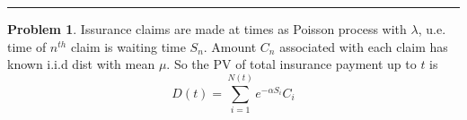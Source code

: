 \documentclass[a4paper, 10pt]{article}
\theoremstyle{definition}
\newtheorem{problem}{Problem}
\theoremstyle{hSol}
\begin{document}
\noindent\rule{16cm}{0.4pt}
\begin{problem} Issurance claims are made at times as Poisson process with $\lambda$, u.e. time of $n^{th}$ claim is waiting time $S_n$. Amount $C_n$ associated with each claim has known i.i.d dist with mean $\mu$. So the PV of total insurance payment up to $t$ is
$$
D(t) = \sum_{i=1}^{N(t)} e^{-\alpha S_i} C_i
$$
\end{problem}
\end{document}
